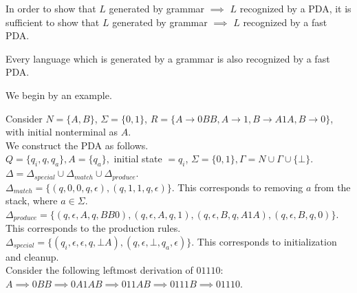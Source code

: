 \documentclass[a4paper]{article}
\newcommand{\nl}{\vspace{0.2cm}\\}
\newcommand{\produces}{\implies}
\begin{document}
\begin{cor}
    In order to show that $L$ generated by grammar $\implies$ $L$ recognized by a PDA, it is sufficient to show that $L$ generated by grammar $\implies$ $L$ recognized by a fast PDA.
\end{cor}

\begin{theorem}
    Every language which is generated by a grammar is also recognized by a fast PDA.
\end{theorem}

We begin by an example.\nl

\begin{eg}
    Consider $N = \{A, B\}$, $\Sigma = \{0, 1\}$, $R = \{A \to 0BB, A \to 1, B \to A1A, B \to 0\}$, with initial nonterminal as $A$.\nl

    We construct the PDA as follows.\nl

    $Q = \{q_i, q, q_a\}, A = \{q_a\},$ initial state $= q_i$, $\Sigma = \{0, 1\}, \Gamma = N \cup \Gamma \cup \{\bot\}$.\nl

    $\Delta = \Delta_{special} \cup \Delta_{match} \cup \Delta_{produce}$.\nl

    $\Delta_{match} = \{(q, 0, 0, q, \epsilon), (q, 1, 1, q, \epsilon)\}$. This corresponds to removing $a$ from the stack, where $a \in \Sigma$.\nl

    $\Delta_{produce} = \{(q, \epsilon, A, q, BB0), (q, \epsilon, A, q, 1), (q, \epsilon, B, q, A1A), (q, \epsilon, B, q, 0)\}$. This corresponds to the production rules.\nl

    $\Delta_{special} = \{(q_i, \epsilon, \epsilon, q, \bot A), (q, \epsilon, \bot, q_a, \epsilon)\}$. This corresponds to initialization and cleanup.\nl

    Consider the following leftmost derivation of $01110$: $A \produces 0BB \produces 0A1AB \produces 011AB \produces 0111B \produces 01110$.\nl


\end{eg}
\end{document}
